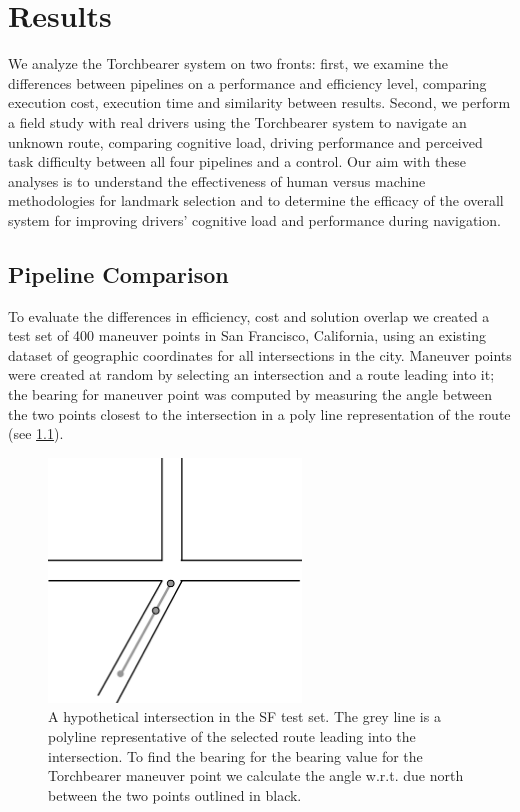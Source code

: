 \chapter{Results}\label{CH:results}

We analyze the Torchbearer system on two fronts: first, we examine the differences between pipelines on a performance and efficiency level, comparing execution cost, execution time and similarity between results. Second, we perform a field study with real drivers using the Torchbearer system to navigate an unknown route, comparing cognitive load, driving performance and perceived task difficulty between all four pipelines and a control. Our aim with these analyses is to understand the effectiveness of human versus machine methodologies for landmark selection and to determine the efficacy of the overall system for improving drivers' cognitive load and performance during navigation.

\section{Pipeline Comparison}

To evaluate the differences in efficiency, cost and solution overlap we created a test set of 400 maneuver points in San Francisco, California, using an existing dataset \cite{sfIntersections} of geographic coordinates for all intersections in the city. Maneuver points were created at random by selecting an intersection and a route leading into it; the bearing for maneuver point was computed by measuring the angle between the two points closest to the intersection in a poly line representation of the route (see \ref{fig:polyline}).

\begin{figure}[htbp]
  \centering
  \includegraphics[width=0.6\textwidth]{images/POLYLINE.pdf}
  \caption{A hypothetical intersection in the SF test set. The grey line is a polyline representative of the selected route leading into the intersection. To find the bearing for the bearing value for the Torchbearer maneuver point we calculate the angle w.r.t. due north between the two points outlined in black.}
  \label{fig:polyline}
\end{figure}

